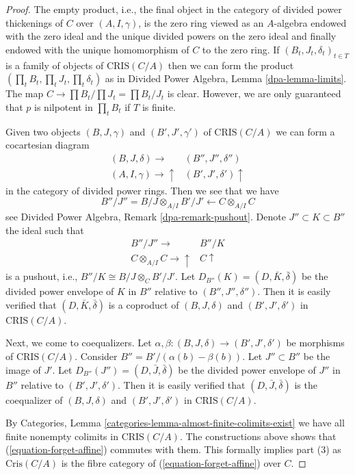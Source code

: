 \begin{proof}
The empty product, i.e., the final object in the category of divided
power thickenings of $C$ over $(A, I, \gamma)$, is the zero ring viewed
as an $A$-algebra endowed with the zero ideal and the unique divided powers
on the zero ideal and finally endowed with the unique homomorphism of $C$ to
the zero ring. If $(B_t, J_t, \delta_t)_{t \in T}$ is a family of objects of
$\text{CRIS}(C/A)$ then we can form the product
$(\prod_t B_t, \prod_t J_t, \prod_t \delta_t)$ as in
Divided Power Algebra, Lemma \ref{dpa-lemma-limits}.
The map $C \to \prod B_t/\prod J_t = \prod B_t/J_t$ is clear.
However, we are only guaranteed that $p$ is nilpotent in $\prod_t B_t$
if $T$ is finite.

\medskip\noindent
Given two objects $(B, J, \gamma)$ and $(B', J', \gamma')$ of
$\text{CRIS}(C/A)$ we can form a cocartesian diagram
$$
\begin{array}{cc}(B, J, \delta) \longrightarrow & (B'', J'', \delta'') \\ (A, I, \gamma) \longrightarrow\uparrow & (B', J', \delta') \uparrow\end{array}
$$
in the category of divided power rings. Then we see that we have
$$
B''/J'' = B/J \otimes_{A/I} B'/J' \longleftarrow C \otimes_{A/I} C
$$
see Divided Power Algebra, Remark \ref{dpa-remark-pushout}.
Denote $J'' \subset K \subset B''$
the ideal such that
$$
\begin{array}{cc}B''/J'' \longrightarrow & B''/K \\ C \otimes_{A/I} C \longrightarrow\uparrow & C \uparrow\end{array}
$$
is a pushout, i.e., $B''/K \cong B/J \otimes_C B'/J'$.
Let $D_{B''}(K) = (D, \bar K, \bar \delta)$
be the divided power envelope of $K$ in $B''$ relative to
$(B'', J'', \delta'')$. Then it is easily verified that
$(D, \bar K, \bar \delta)$ is a coproduct of $(B, J, \delta)$ and
$(B', J', \delta')$ in $\text{CRIS}(C/A)$.

\medskip\noindent
Next, we come to coequalizers. Let
$\alpha, \beta : (B, J, \delta) \to (B', J', \delta')$ be morphisms of
$\text{CRIS}(C/A)$. Consider $B'' = B'/ (\alpha(b) - \beta(b))$. Let
$J'' \subset B''$ be the image of $J'$. Let
$D_{B''}(J'') = (D, \bar J, \bar\delta)$ be the divided power envelope of
$J''$ in $B''$ relative to $(B', J', \delta')$. Then it is easily verified
that $(D, \bar J, \bar \delta)$ is the coequalizer of $(B, J, \delta)$ and
$(B', J', \delta')$ in $\text{CRIS}(C/A)$.

\medskip\noindent
By Categories, Lemma \ref{categories-lemma-almost-finite-colimits-exist}
we have all finite nonempty colimits in $\text{CRIS}(C/A)$. The constructions
above shows that (\ref{equation-forget-affine}) commutes with them.
This formally implies part (3) as $\text{Cris}(C/A)$ is the fibre category
of (\ref{equation-forget-affine}) over $C$.
\end{proof}

